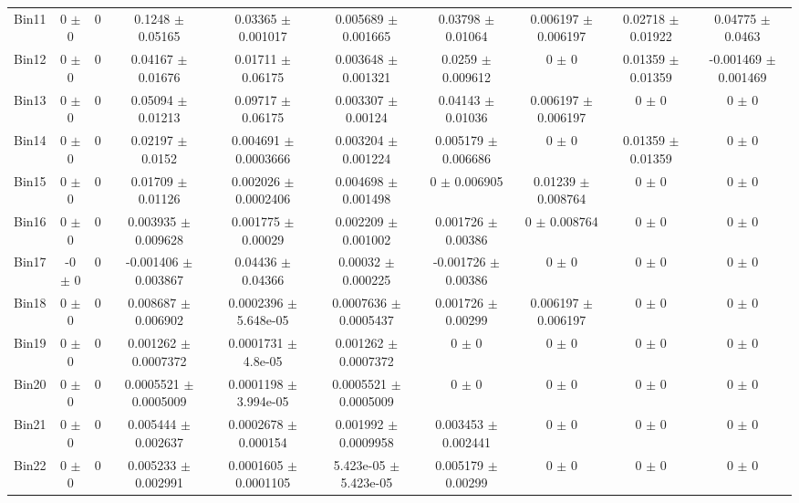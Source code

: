 \begin{tabular}{@{\extracolsep{4pt}}lccccccccc@{}}
     Bin11 & 0 $\pm$ 0 & 0 & 0.1248 $\pm$ 0.05165 & 0.03365 $\pm$ 0.001017 & 0.005689 $\pm$ 0.001665 & 0.03798 $\pm$ 0.01064 & 0.006197 $\pm$ 0.006197 & 0.02718 $\pm$ 0.01922 & 0.04775 $\pm$ 0.0463 \\ 
     Bin12 & 0 $\pm$ 0 & 0 & 0.04167 $\pm$ 0.01676 & 0.01711 $\pm$ 0.06175 & 0.003648 $\pm$ 0.001321 & 0.0259 $\pm$ 0.009612 & 0 $\pm$ 0 & 0.01359 $\pm$ 0.01359 & -0.001469 $\pm$ 0.001469 \\ 
     Bin13 & 0 $\pm$ 0 & 0 & 0.05094 $\pm$ 0.01213 & 0.09717 $\pm$ 0.06175 & 0.003307 $\pm$ 0.00124 & 0.04143 $\pm$ 0.01036 & 0.006197 $\pm$ 0.006197 & 0 $\pm$ 0 & 0 $\pm$ 0 \\ 
     Bin14 & 0 $\pm$ 0 & 0 & 0.02197 $\pm$ 0.0152 & 0.004691 $\pm$ 0.0003666 & 0.003204 $\pm$ 0.001224 & 0.005179 $\pm$ 0.006686 & 0 $\pm$ 0 & 0.01359 $\pm$ 0.01359 & 0 $\pm$ 0 \\ 
     Bin15 & 0 $\pm$ 0 & 0 & 0.01709 $\pm$ 0.01126 & 0.002026 $\pm$ 0.0002406 & 0.004698 $\pm$ 0.001498 & 0 $\pm$ 0.006905 & 0.01239 $\pm$ 0.008764 & 0 $\pm$ 0 & 0 $\pm$ 0 \\ 
     Bin16 & 0 $\pm$ 0 & 0 & 0.003935 $\pm$ 0.009628 & 0.001775 $\pm$ 0.00029 & 0.002209 $\pm$ 0.001002 & 0.001726 $\pm$ 0.00386 & 0 $\pm$ 0.008764 & 0 $\pm$ 0 & 0 $\pm$ 0 \\ 
     Bin17 & -0 $\pm$ 0 & 0 & -0.001406 $\pm$ 0.003867 & 0.04436 $\pm$ 0.04366 & 0.00032 $\pm$ 0.000225 & -0.001726 $\pm$ 0.00386 & 0 $\pm$ 0 & 0 $\pm$ 0 & 0 $\pm$ 0 \\ 
     Bin18 & 0 $\pm$ 0 & 0 & 0.008687 $\pm$ 0.006902 & 0.0002396 $\pm$ 5.648e-05 & 0.0007636 $\pm$ 0.0005437 & 0.001726 $\pm$ 0.00299 & 0.006197 $\pm$ 0.006197 & 0 $\pm$ 0 & 0 $\pm$ 0 \\ 
     Bin19 & 0 $\pm$ 0 & 0 & 0.001262 $\pm$ 0.0007372 & 0.0001731 $\pm$ 4.8e-05 & 0.001262 $\pm$ 0.0007372 & 0 $\pm$ 0 & 0 $\pm$ 0 & 0 $\pm$ 0 & 0 $\pm$ 0 \\ 
     Bin20 & 0 $\pm$ 0 & 0 & 0.0005521 $\pm$ 0.0005009 & 0.0001198 $\pm$ 3.994e-05 & 0.0005521 $\pm$ 0.0005009 & 0 $\pm$ 0 & 0 $\pm$ 0 & 0 $\pm$ 0 & 0 $\pm$ 0 \\ 
     Bin21 & 0 $\pm$ 0 & 0 & 0.005444 $\pm$ 0.002637 & 0.0002678 $\pm$ 0.000154 & 0.001992 $\pm$ 0.0009958 & 0.003453 $\pm$ 0.002441 & 0 $\pm$ 0 & 0 $\pm$ 0 & 0 $\pm$ 0 \\ 
     Bin22 & 0 $\pm$ 0 & 0 & 0.005233 $\pm$ 0.002991 & 0.0001605 $\pm$ 0.0001105 & 5.423e-05 $\pm$ 5.423e-05 & 0.005179 $\pm$ 0.00299 & 0 $\pm$ 0 & 0 $\pm$ 0 & 0 $\pm$ 0 \\ 

\end{tabular}

